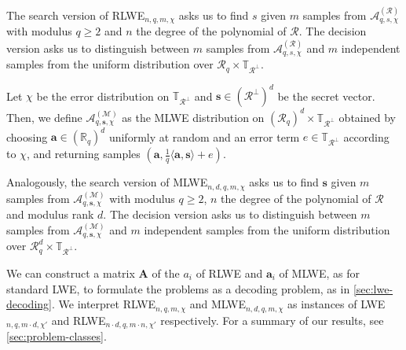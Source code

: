The search version of RLWE$_{n, q, m, \chi}$ asks us to find $s$ given $m$ samples from $\mathcal{A}_{q, s, \chi}^{(\mathcal{R})}$ with modulus $q\geq 2$ and $n$ the degree of the polynomial of $\mathcal{R}$. The decision version asks us to distinguish between $m$ samples from $\mathcal{A}_{q, s, \chi}^{(\mathcal{R})}$ and $m$ independent samples from the uniform distribution over $\mathcal{R}_q \times \mathbb{T}_{\mathcal{R}^\perp}$.

\begin{definition}
    Let $\chi$ be the error distribution on $\mathbb{T}_{\mathcal{R}^\perp}$ and $\mathbf{s} \in (\mathcal{R}^\perp)^d$ be the secret vector. Then, we define $\mathcal{A}_{q, \mathbf{s}, \chi}^{(\mathcal{M})}$ as the MLWE distribution on $(\mathcal{R}_q)^d \times \mathbb{T}_{\mathcal{R}^\perp}$ obtained by choosing $\mathbf{a} \in (\mathbb{R}_q)^d$ uniformly at random and an error term $e \in \mathbb{T}_{\mathcal{R}^\perp}$ according to $\chi$, and returning samples $(\mathbf{a}, \frac{1}{q}\langle \mathbf{a},\mathbf{s}\rangle + e)$.
\end{definition}

Analogously, the search version of MLWE$_{n, d, q, m, \chi}$ asks us to find $\mathbf{s}$ given $m$ samples from $\mathcal{A}_{q, \mathbf{s}, \chi}^{(\mathcal{M})}$ with modulus $q\geq 2$, $n$ the degree of the polynomial of $\mathcal{R}$ and modulus rank $d$. The decision version asks us to distinguish between $m$ samples from $\mathcal{A}_{q, \mathbf{s}, \chi}^{(\mathcal{M})}$ and $m$ independent samples from the uniform distribution over $\mathcal{R}_q^d \times \mathbb{T}_{\mathcal{R}^\perp}$.

We can construct a matrix $\mathbf{A}$ of the $a_i$ of RLWE and $\mathbf{a}_i$ of MLWE, as for standard LWE, to formulate the problems as a decoding problem, as in \cref{sec:lwe-decoding}. We interpret RLWE$_{n, q, m, \chi}$ and MLWE$_{n, d, q, m, \chi}$ as instances of LWE$_{n, q, m \cdot d, \chi'}$ and RLWE$_{n\cdot d, q, m \cdot n, \chi'}$ respectively. For a summary of our results, see \cref{sec:problem-classes}.


